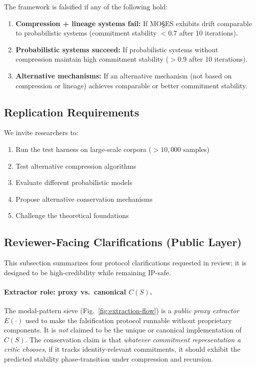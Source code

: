 \documentclass[11pt,a4paper]{article}
\begin{document}
The framework is falsified if any of the following hold:

\begin{enumerate}
    \item \textbf{Compression + lineage systems fail:} If MO\S{}ES\texttrademark{} exhibits drift comparable to probabilistic systems (commitment stability $< 0.7$ after 10 iterations).

    \item \textbf{Probabilistic systems succeed:} If probabilistic systems without compression maintain high commitment stability ($> 0.9$ after 10 iterations).

    \item \textbf{Alternative mechanisms:} If an alternative mechanism (not based on compression or lineage) achieves comparable or better commitment stability.
\end{enumerate}

\subsection{Replication Requirements}

We invite researchers to:
\begin{enumerate}
    \item Run the test harness on large-scale corpora ($>10{,}000$ samples)
    \item Test alternative compression algorithms
    \item Evaluate different probabilistic models
    \item Propose alternative conservation mechanisms
    \item Challenge the theoretical foundations
\end{enumerate}

\subsection{Reviewer-Facing Clarifications (Public Layer)}
\label{sec:reviewer-clarifications}

This subsection summarizes four protocol clarifications requested in review; it is designed to be high-credibility while remaining IP-safe.

\paragraph{Extractor role: proxy vs.\ canonical $C(S)$.}
The modal-pattern sieve (Fig.~\ref{fig:extraction-flow}) is a \emph{public proxy extractor} $E(\cdot)$ used to make the falsification protocol runnable without proprietary components. It is \emph{not} claimed to be the unique or canonical implementation of $C(S)$. The conservation claim is that \emph{whatever commitment representation a critic chooses}, if it tracks identity-relevant commitments, it should exhibit the predicted stability phase-transition under compression and recursion.
\end{document}
